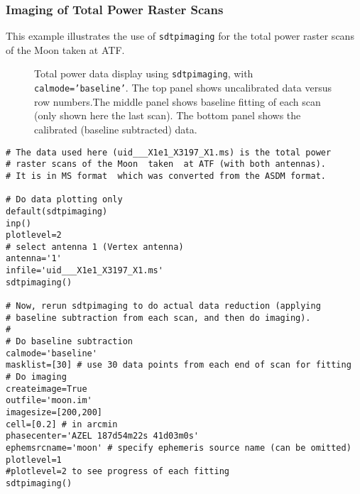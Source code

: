 \subsubsection{Imaging of Total Power Raster Scans}
This example illustrates the use of {\tt sdtpimaging} for the total
power raster scans of the Moon taken at ATF.
\begin{figure}[h!]
\begin{center}
\caption{\label{fig:sdtpimaging} Total power data display using {\tt sdtpimaging}, 
with {\tt calmode='baseline'}. The top  panel shows uncalibrated data versus row numbers.The middle panel shows baseline fitting of each scan (only shown here the last
scan). The bottom panel shows the calibrated (baseline subtracted) data. }
\hrulefill
\end{center}
\end{figure}

\begin{verbatim}
# The data used here (uid___X1e1_X3197_X1.ms) is the total power 
# raster scans of the Moon  taken  at ATF (with both antennas). 
# It is in MS format  which was converted from the ASDM format.

# Do data plotting only
default(sdtpimaging)
inp()
plotlevel=2
# select antenna 1 (Vertex antenna) 
antenna='1'
infile='uid___X1e1_X3197_X1.ms'
sdtpimaging()

# Now, rerun sdtpimaging to do actual data reduction (applying
# baseline subtraction from each scan, and then do imaging).
#
# Do baseline subtraction 
calmode='baseline'
masklist=[30] # use 30 data points from each end of scan for fitting
# Do imaging 
createimage=True
outfile='moon.im'
imagesize=[200,200]
cell=[0.2] # in arcmin
phasecenter='AZEL 187d54m22s 41d03m0s'  
ephemsrcname='moon' # specify ephemeris source name (can be omitted)
plotlevel=1
#plotlevel=2 to see progress of each fitting
sdtpimaging()
\end{verbatim}




